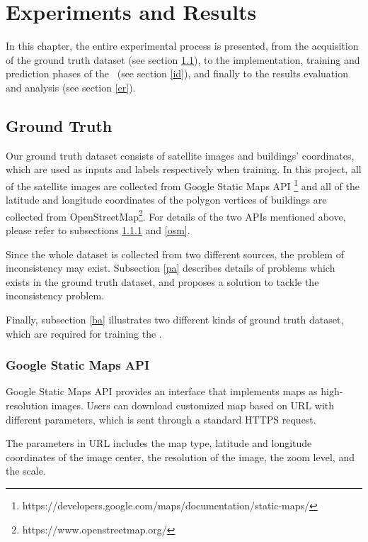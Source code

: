 \chapter{Experiments and Results}

In this chapter, the entire experimental process is presented, from the acquisition of the ground truth dataset (see section \ref{gt}), to the implementation, training and prediction phases of the \modelnameshort\ (see section \ref{id}), and finally to the results evaluation and analysis (see section \ref{er}).

\section{Ground Truth}\label{gt}

Our ground truth dataset consists of satellite images and buildings' coordinates, which are used as inputs and labels respectively when training. In this project, all of the satellite images are collected from Google Static Maps API \footnote{https://developers.google.com/maps/documentation/static-maps/} and all of the latitude and longitude coordinates of the polygon vertices of buildings are collected from OpenStreetMap\footnote{https://www.openstreetmap.org/}. For details of the two APIs mentioned above, please refer to subsections \ref{google} and \ref{osm}.

Since the whole dataset is collected from two different sources, the problem of inconsistency may exist. Subsection \ref{pa} describes details of problems which exists in the ground truth dataset, and proposes a solution to tackle the inconsistency problem.

Finally, subsection \ref{ba} illustrates two different kinds of ground truth dataset, which are required for training the \modelnameshort.

\subsection{Google Static Maps API}\label{google}

Google Static Maps API provides an interface that implements maps as high-resolution images. Users can download customized map based on URL with different parameters, which is sent through a standard HTTPS request.

The parameters in URL includes the map type, latitude and longitude coordinates of the image center, the resolution of the image, the zoom level, and the scale.

